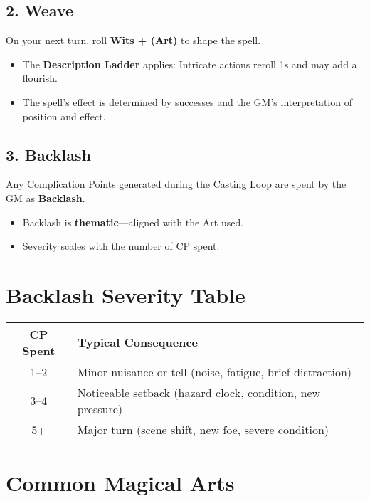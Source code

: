 \subsection*{2. Weave}

On your next turn, roll \textbf{Wits + (Art)} to shape the spell.

\begin{itemize}
  \item The \textbf{Description Ladder} applies: Intricate actions reroll 1s and may add a flourish.
  \item The spell’s effect is determined by successes and the GM’s interpretation of position and effect.
\end{itemize}

\subsection*{3. Backlash}

Any Complication Points generated during the Casting Loop are spent by the GM as \textbf{Backlash}.

\begin{itemize}
  \item Backlash is \textbf{thematic}—aligned with the Art used.
  \item Severity scales with the number of CP spent.
\end{itemize}

\section{Backlash Severity Table}

\begin{center}
\begin{tabular}{cl}
\toprule
\textbf{CP Spent} & \textbf{Typical Consequence} \\
\midrule
1–2 & Minor nuisance or tell (noise, fatigue, brief distraction) \\
3–4 & Noticeable setback (hazard clock, condition, new pressure) \\
5+ & Major turn (scene shift, new foe, severe condition) \\
\bottomrule
\end{tabular}
\end{center}

\section{Common Magical Arts}

